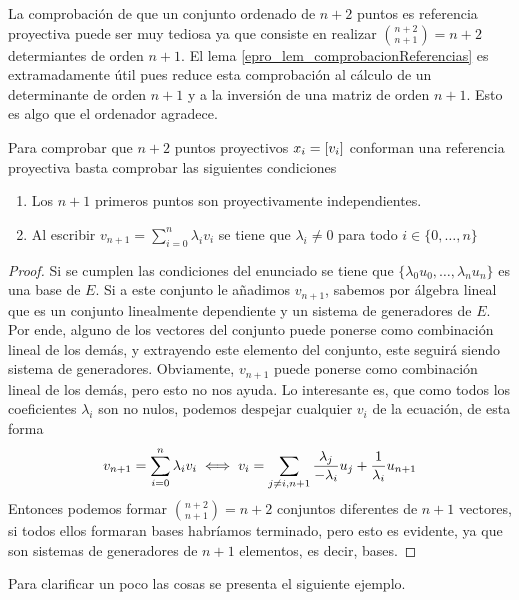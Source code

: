 La comprobación de que un conjunto ordenado de $n+2$ puntos es referencia proyectiva puede ser muy tediosa ya que consiste en realizar $\binom{n+2}{n+1}=n+2$ determiantes de orden $n+1$. El lema \ref{epro_lem_comprobacionReferencias} es extramadamente útil pues reduce esta comprobación al cálculo de un determinante de orden $n+1$ y a la inversión de una matriz de orden $n+1$. Esto es algo que el ordenador agradece.
\begin{lem}
	\label{epro_lem_comprobacionReferencias}
	Para comprobar que $n+2$ puntos proyectivos $x_i=\left [ v_i \right ]$ conforman una referencia proyectiva basta comprobar las siguientes condiciones\begin{enumerate}
		\item Los $n+1$ primeros puntos son proyectivamente independientes.
		\item Al escribir $v_{n+1}=\sum_{i=0}^{n}\lambda_iv_i$ se tiene que $\lambda_i\not=0$ para todo $i\in\{0,\dots,n\}$
	\end{enumerate}
\end{lem}
\begin{proof}
	Si se cumplen las condiciones del enunciado se tiene que $\{\lambda_0u_0,\dots,\lambda_nu_n\}$ es una base de $E$. Si a este conjunto le añadimos $v_{n+1}$, sabemos por álgebra lineal que es un conjunto linealmente dependiente y un sistema de generadores de $E$. Por ende, alguno de los vectores del conjunto puede ponerse como combinación lineal de los demás, y extrayendo este elemento del conjunto, este seguirá siendo sistema de generadores. Obviamente, $v_{n+1}$ puede ponerse como combinación lineal de los demás, pero esto no nos ayuda. Lo interesante es, que como todos los coeficientes $\lambda_i$ son no nulos, podemos despejar cualquier $v_i$ de la ecuación, de esta forma
	\begin{equation*}
		v_{n+1}=\sum_{i=0}^{n}\lambda_iv_i\iff v_i = \sum_{j\not=i,n+1}\frac{\lambda_j}{-\lambda_i}u_j+\frac{1}{\lambda_i}u_{n+1}
	\end{equation*}
	Entonces podemos formar $\binom{n+2}{n+1}=n+2$ conjuntos diferentes de $n+1$ vectores, si todos ellos formaran bases habríamos terminado, pero esto es evidente, ya que son sistemas de generadores de $n+1$ elementos, es decir, bases.
\end{proof}
Para clarificar un poco las cosas se presenta el siguiente ejemplo.
